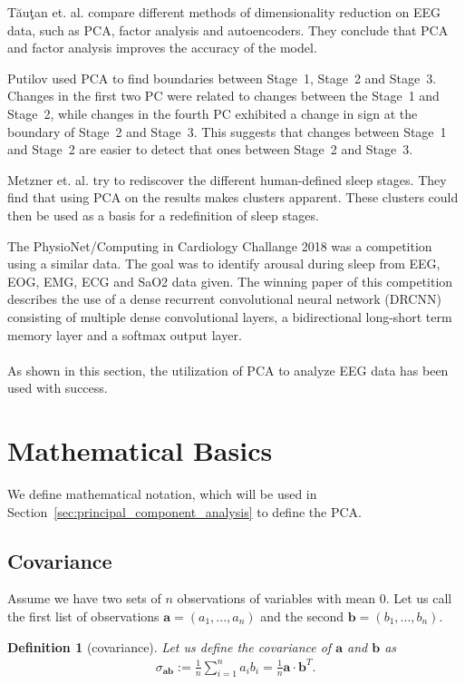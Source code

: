 \documentclass[a4paper]{IEEEtran}
\newtheorem{definition}{Definition}
\begin{document}
Tăuţan et. al.\cite{Tautan2021} compare different methods of dimensionality reduction on EEG data, such as PCA, factor analysis and autoencoders. They conclude that PCA and factor analysis improves the accuracy of the model.

Putilov\cite{Putilov2015} used PCA to find boundaries between Stage~1, Stage~2 and Stage~3. Changes in the first two PC were related to changes between the Stage~1 and Stage~2, while changes in the fourth PC exhibited a change in sign at the boundary of Stage~2 and Stage~3. This suggests that changes between Stage~1 and Stage~2 are easier to detect that ones between Stage~2 and Stage~3.

Metzner et. al.\cite{Metzner2023} try to rediscover the different human-defined sleep stages. They find that using PCA on the results makes clusters apparent. These clusters could then be used as a basis for a redefinition of sleep stages.

The PhysioNet/Computing in Cardiology Challange 2018 was a competition using a similar data\cite{Ghassemi2018}. The goal was to identify arousal during sleep from EEG, EOG, EMG, ECG and SaO2 data given. The winning paper of this competition describes the use of a dense recurrent convolutional neural network (DRCNN) consisting of multiple dense convolutional layers, a bidirectional long-short term memory layer and a softmax output layer\cite{Howe2018}.
\\
\\
As shown in this section, the utilization of PCA to analyze EEG data has been used with success.

\section{Mathematical Basics}
\label{sec:mathematical_basics}

We define mathematical notation, which will be used in Section~\ref{sec:principal_component_analysis} to define the PCA.

\subsection{Covariance}
Assume we have two sets of $n$ observations of variables with mean 0. Let us call the first list of observations $\mathbf{a} = (a_1, ..., a_n)$ and the second $\mathbf{b} = (b_1, ..., b_n)$.

\begin{definition}[covariance]
Let us define the \textit{covariance} of $\mathbf{a}$ and $\mathbf{b}$ as
\begin{align*}
	\sigma_{\mathbf{ab}} := \frac{1}{n} \sum_{i=1}^{n}a_ib_i = \frac{1}{n}\mathbf{a}\cdot\mathbf{b}^T.
\end{align*}
\end{definition}
\end{document}
